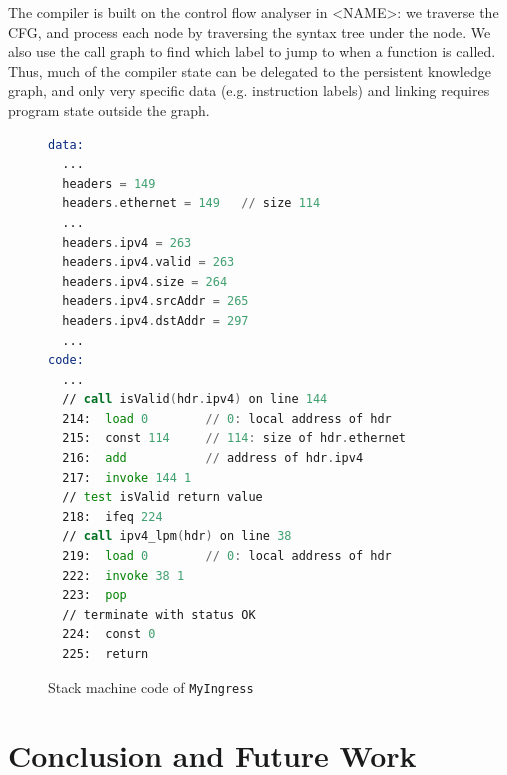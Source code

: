 \documentclass[sigconf]{acmart}
\begin{document}
  The compiler is built on the control flow analyser in <NAME>: we traverse the CFG, and process each node by traversing the syntax tree under the node. We also use the call graph to find which label to jump to when a function is called. Thus, much of the compiler state can be delegated to the persistent knowledge graph, and only very specific data (e.g. instruction labels) and linking requires program state outside the graph.  

  \begin{figure}
  \begin{lstlisting}[language=asm]
data:
  ...
  headers = 149 
  headers.ethernet = 149   // size 114
  ...
  headers.ipv4 = 263 
  headers.ipv4.valid = 263 
  headers.ipv4.size = 264 
  headers.ipv4.srcAddr = 265 
  headers.ipv4.dstAddr = 297
  ...
code:
  ...
  // call isValid(hdr.ipv4) on line 144
  214:  load 0	      // 0: local address of hdr
  215:  const 114     // 114: size of hdr.ethernet
  216:  add           // address of hdr.ipv4
  217:  invoke 144 1		 
  // test isValid return value
  218:  ifeq 224		 
  // call ipv4_lpm(hdr) on line 38
  219:  load 0        // 0: local address of hdr
  222:  invoke 38 1		 
  223:  pop
  // terminate with status OK
  224:  const 0		 
  225:  return 
\end{lstlisting}
\caption{Stack machine code of \texttt{MyIngress}}
  \label{code:stack}
\end{figure}
  
	\section{Conclusion and Future Work} %
\end{document}
